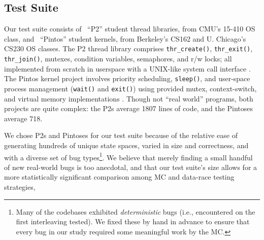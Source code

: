 
\subsection{Test Suite}
\label{sec:testsuite}
Our test suite consists of \numthrlibs~``P2'' student thread libraries, from CMU's 15-410 OS class,
and \numpintoses~``Pintos'' student kernels, from Berkeley's CS162 and U. Chicago's CS230 OS classes.
%
The P2 thread library comprises \texttt{thr\_create()}, \texttt{thr\_exit()}, \texttt{thr\_join()}, mutexes, condition variables, semaphores, and r/w locks;
all implemented from scratch in userspace with a UNIX-like system call interface \cite{kspec,thrlib}.
%
The Pintos kernel project
involves priority scheduling, \texttt{sleep()}, and user-space process management (\texttt{wait()} and \texttt{exit()})
using provided mutex, context-switch, and virtual memory implementations
\cite{pintos}.
Though not ``real world'' programs, both projects are quite complex:
the P2s average 1807 lines of code, %
and the Pintoses average 718.

We chose P2s and Pintoses for our test suite because of the relative ease of generating hundreds of unique state spaces,
varied in size and correctness, and with a diverse set of bug types\footnote{
Many of the codebases exhibited {\em deterministic} bugs (i.e., encountered on the first interleaving tested).
We fixed these by hand in advance to ensure that every bug in our study required some meaningful work by the MC.}.
We believe that merely finding a small handful of new real-world bugs is too anecdotal,
and that our test suite's size allows for a more statistically significant comparison among MC and data-race testing strategies,

